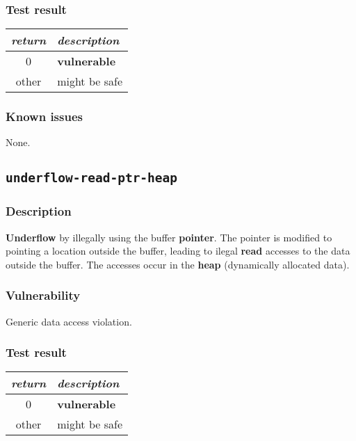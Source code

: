 \documentclass[a4paper]{book}
\begin{document}
\subsubsection{Test result}

\begin{tabular}{cl}
  \toprule
  \emph{return}  & \emph{description} \\
  \midrule
  0              & \textbf{vulnerable} \\
  other          & might be safe \\
  \bottomrule
\end{tabular}

\subsubsection{Known issues}

None.

\newpage

\subsection{\texttt{underflow-read-ptr-heap}}\label{test-underflow-read-ptr-heap}

\subsubsection{Description}

\textbf{Underflow} by illegally using the buffer \textbf{pointer}.
The pointer is modified to pointing a location outside the buffer,
leading to ilegal \textbf{read} accesses to the data outside the buffer.
The accesses occur in the \textbf{heap} (dynamically allocated data).

\subsubsection{Vulnerability}
Generic data access violation.

\subsubsection{Test result}

\begin{tabular}{cl}
  \toprule
  \emph{return}  & \emph{description} \\
  \midrule
  0              & \textbf{vulnerable} \\
  other          & might be safe \\
  \bottomrule
\end{tabular}
\end{document}

